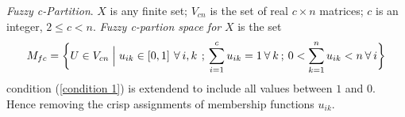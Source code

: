 \documentclass[english]{HSMW-Thesis}
\begin{document}
\begin{definition}\cite{bezdek1981pattern}
	\emph{Fuzzy c-Partition}\label{def:Fuzzy c-Partition}.\hspace{2pt} $ X $\hspace{2pt} is any finite set;\hspace{2pt} $V_{cn}$ is the set of real\hspace{2pt} $c\times n$\hspace{2pt} matrices;\hspace{2pt} $c$\hspace{2pt} is an integer,\hspace{2pt} $2\leq c< n$.\hspace{2pt} \emph{Fuzzy c-partion space for}\hspace{2pt} $X$\hspace{2pt} is the set
	\begin{equation}\label{Fuzzy set space}
		M_{fc}= \bigg\{ U\in V_{cn}\Bigm| u_{ik}\in \left[ 0,1\right]\hspace{2pt}  \forall\hspace{2pt} i,k\hspace{2pt} \hspace{2pt};\hspace{2pt} \sum_{i=1}^{c} u_{ik}=1\hspace{2pt} \forall\hspace{2pt} k \hspace{2pt};\hspace{2pt}  0<\sum_{k=1}^{n} u_{ik}< n \hspace{2pt} \forall\hspace{2pt} i \bigg\}
	\end{equation}
 condition (\ref{condition 1}) is extendend to include all values between $1$ and $0$. Hence removing the crisp assignments of membership functions $u_{ik}$\cite{bezdek1981pattern}.
	
\end{definition}
\end{document}
